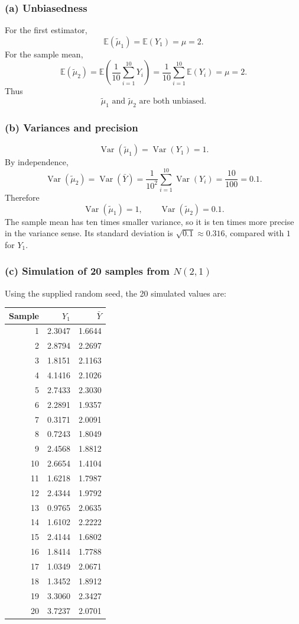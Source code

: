 \documentclass[11pt,a4paper]{article}
\newcommand{\E}{\mathbb{E}}
\newcommand{\Var}{\operatorname{Var}}
\begin{document}
\subsubsection*{(a) Unbiasedness}
For the first estimator,
\[
 \E(\tilde\mu_1)=\E(Y_1)=\mu=2.
\]
For the sample mean,
\[
 \E(\tilde\mu_2)
 =\E\!\left(\frac{1}{10}\sum_{i=1}^{10}Y_i\right)
 =\frac{1}{10}\sum_{i=1}^{10}\E(Y_i)
 =\mu=2.
\]
Thus
\[
 \boxed{\tilde\mu_1\text{ and }\tilde\mu_2\text{ are both unbiased}.}
\]

\subsubsection*{(b) Variances and precision}
\[
 \Var(\tilde\mu_1)=\Var(Y_1)=1.
\]
By independence,
\[
 \Var(\tilde\mu_2)
 =\Var(\bar Y)
 =\frac{1}{10^2}\sum_{i=1}^{10}\Var(Y_i)
 =\frac{10}{100}
 =0.1.
\]
Therefore
\[
 \boxed{\Var(\tilde\mu_1)=1,\qquad \Var(\tilde\mu_2)=0.1.}
\]
The sample mean has ten times smaller variance, so it is ten times more precise in the variance sense. Its standard deviation is $\sqrt{0.1}\approx0.316$, compared with $1$ for $Y_1$.

\subsubsection*{(c) Simulation of 20 samples from $N(2,1)$}
Using the supplied random seed, the 20 simulated values are:

\begin{center}
\begin{tabular}{r@{\qquad}rr}
\toprule
Sample & $Y_1$ & $\bar Y$\\
\midrule
1 & 2.3047 & 1.6644\\
2 & 2.8794 & 2.2697\\
3 & 1.8151 & 2.1163\\
4 & 4.1416 & 2.1026\\
5 & 2.7433 & 2.3030\\
6 & 2.2891 & 1.9357\\
7 & 0.3171 & 2.0091\\
8 & 0.7243 & 1.8049\\
9 & 2.4568 & 1.8812\\
10 & 2.6654 & 1.4104\\
11 & 1.6218 & 1.7987\\
12 & 2.4344 & 1.9792\\
13 & 0.9765 & 2.0635\\
14 & 1.6102 & 2.2222\\
15 & 2.4144 & 1.6802\\
16 & 1.8414 & 1.7788\\
17 & 1.0349 & 2.0671\\
18 & 1.3452 & 1.8912\\
19 & 3.3060 & 2.3427\\
20 & 3.7237 & 2.0701\\
\bottomrule
\end{tabular}
\end{center}
\end{document}
